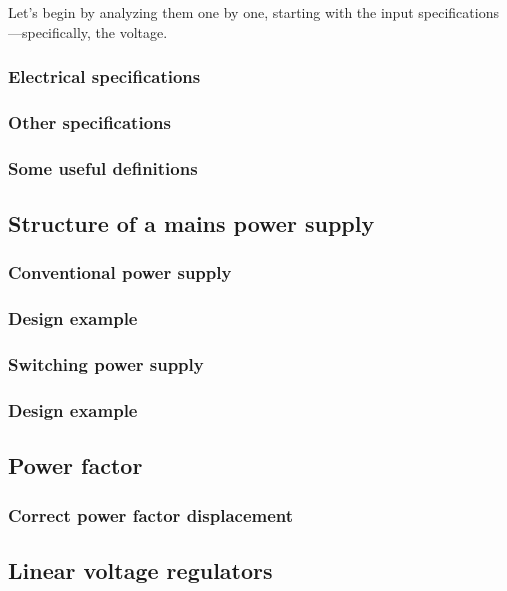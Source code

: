 \documentclass[../main.tex]{subfiles}
\begin{document}
Let’s begin by analyzing them one by one, starting with the input specifications—specifically, the voltage.

\subsubsection{Electrical specifications}
\subsubsection{Other specifications}
\subsubsection{Some useful definitions}

\subsection{Structure of a mains power supply}


\subsubsection{Conventional power supply}




\subsubsection{Design example}
\subsubsection{Switching power supply}
\subsubsection{Design example}

\subsection{Power factor}
\subsubsection{Correct power factor displacement}

\subsection{Linear voltage regulators}
\end{document}
